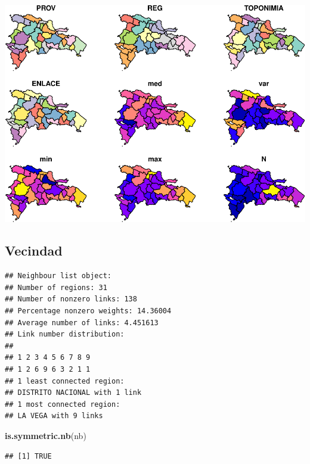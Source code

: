 \documentclass[11pt,]{article}
\newenvironment{Shaded}{\begin{snugshade}}{\end{snugshade}}
\newcommand{\KeywordTok}[1]{\textcolor[rgb]{0.13,0.29,0.53}{\textbf{#1}}}
\newcommand{\StringTok}[1]{\textcolor[rgb]{0.31,0.60,0.02}{#1}}
\newcommand{\OperatorTok}[1]{\textcolor[rgb]{0.81,0.36,0.00}{\textbf{#1}}}
\newcommand{\NormalTok}[1]{#1}
\begin{document}
\includegraphics{proyecto_files/figure-latex/unnamed-chunk-9-1.pdf}

\subsection{Vecindad}\label{vecindad}

\begin{Shaded}
\end{Shaded}

\begin{verbatim}
## Neighbour list object:
## Number of regions: 31 
## Number of nonzero links: 138 
## Percentage nonzero weights: 14.36004 
## Average number of links: 4.451613 
## Link number distribution:
## 
## 1 2 3 4 5 6 7 8 9 
## 1 2 6 9 6 3 2 1 1 
## 1 least connected region:
## DISTRITO NACIONAL with 1 link
## 1 most connected region:
## LA VEGA with 9 links
\end{verbatim}

\begin{Shaded}
\begin{Highlighting}[]
\KeywordTok{is.symmetric.nb}\NormalTok{(nb)}
\end{Highlighting}
\end{Shaded}

\begin{verbatim}
## [1] TRUE
\end{verbatim}
\end{document}
